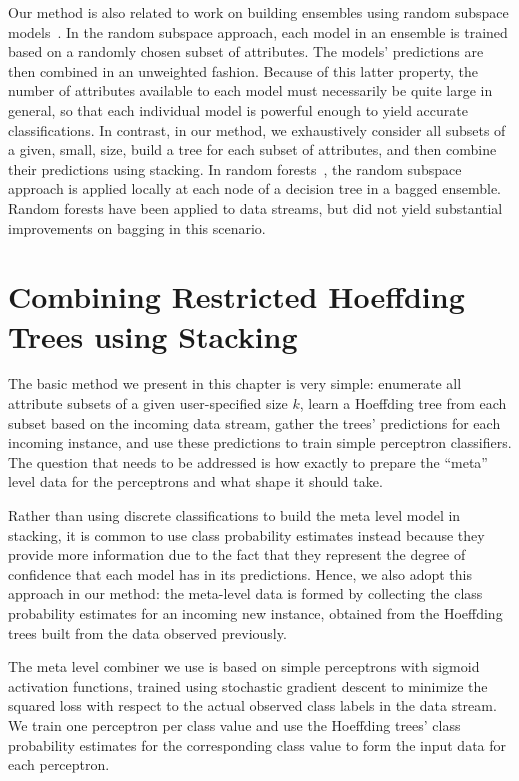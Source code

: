 Our method is also related to work on building ensembles using random
subspace models~\cite{Random-subspace}. In the random subspace approach, each
model in an ensemble is trained based on a randomly chosen subset of
attributes. The models' predictions are then combined in an unweighted
fashion. %
Because of this latter property, the
number of attributes available to each model must necessarily be quite
large in general, so that each individual model is powerful enough to
yield accurate classifications. In contrast, in our method, we
exhaustively consider all subsets of a given, small, size, build a
tree for each subset of attributes, and then combine their predictions
using stacking. In random forests~\cite{randomforests}, the random subspace
approach is applied locally at each node of a decision tree in a
bagged ensemble. Random forests have  been applied to data streams, but did not
yield substantial improvements on bagging in this
scenario. %


\section{Combining Restricted Hoeffding Trees using Stacking}

The basic method we present in this chapter is very simple: enumerate
all attribute subsets of a given user-specified size $k$, learn
a Hoeffding tree from each subset based on the incoming data stream,
gather the trees' predictions for each incoming instance, and use
these predictions to train simple perceptron classifiers. The question that needs
to be addressed is how exactly to prepare the ``meta'' level data for
the perceptrons and what shape it should take.

Rather than using discrete classifications to build the meta level
model in stacking, it is common to use class probability estimates
instead because they provide more information due to the fact that they
represent the degree of confidence that each model has in its
predictions. Hence, we also adopt this approach in our method: the
meta-level data is formed by collecting the class probability
estimates for an incoming new instance, obtained from the Hoeffding
trees built from the data observed previously.

The meta level combiner we use is based on simple perceptrons with sigmoid
activation functions, trained using stochastic gradient
descent to minimize the squared loss with respect to the actual
observed class labels in the data stream. We train one perceptron per
class value and use the Hoeffding trees' class probability estimates
for the corresponding class value to form the input data for each
perceptron.

